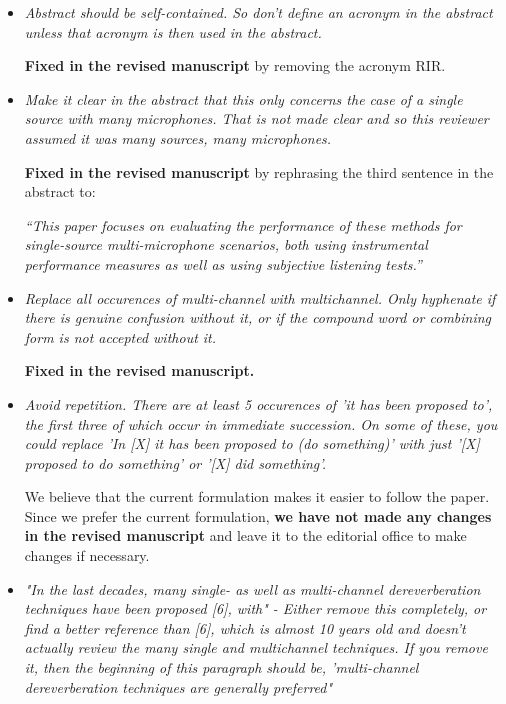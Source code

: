 \documentclass[10pt, a4paper]{article}
\begin{document}
\begin{itemize}
\item {\textit{Abstract should be self-contained. So don't define an acronym in the abstract unless that acronym is then used in the abstract.}}

{\textbf{Fixed in the revised manuscript}} by removing the acronym RIR.

\item {\textit{Make it clear in the abstract that this only concerns the case of a single source with many microphones. That is not made clear and so this reviewer assumed it was many sources, many microphones.}}

{\textbf{Fixed in the revised manuscript}} by rephrasing the third sentence in the abstract to:

{\emph{``This paper focuses on evaluating the performance of these methods for single-source multi-microphone scenarios, both using instrumental performance measures as well as using subjective listening tests.''}}

\item {\textit{Replace all occurences of multi-channel with multichannel. Only hyphenate if there is genuine confusion without it, or if the compound word or combining form is not accepted without it.}}

{\textbf{Fixed in the revised manuscript.}}

\item {\textit{Avoid repetition. There are at least 5 occurences of 'it has been proposed to', the first three of which occur in immediate succession. On some of these, you could replace 'In [X] it has been proposed to (do something)' with just '[X] proposed to do something' or '[X] did something'.}}

We believe that the current formulation makes it easier to follow the paper. 
Since we prefer the current formulation, {\textbf{we have not made any changes in the revised manuscript}} and leave it to the editorial office to make changes if necessary.

\item {\textit{"In the last decades, many single- as well as multi-channel dereverberation techniques have been proposed [6], with" - Either remove this completely, or find a better reference than [6], which is almost 10 years old and doesn't actually review the many single and multichannel techniques. If you remove it, then the beginning of this paragraph should be, 'multi-channel dereverberation techniques are  generally preferred"}}


\end{itemize}
\end{document}
